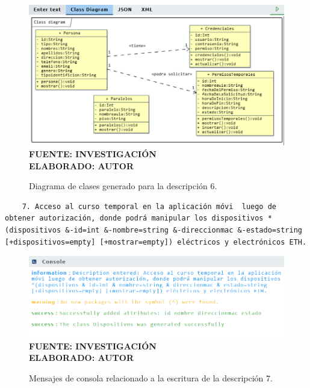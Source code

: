  \begin{figure}[H]
 	\centering
 	\caption{Diagrama de clases generado para la descripción 6.}
 	\includegraphics[width=15cm]{img/dc-eva-006.png}
 	\label{fig:dc_eva_006}
 	\vspace{4mm}
 	{\footnotesize \textbf{\\ FUENTE: INVESTIGACIÓN} \textbf{\\ ELABORADO: AUTOR}}
 \end{figure}
 
  \begin{lstlisting}
 	7. Acceso al curso temporal en la aplicación móvi  luego de obtener autorización, donde podrá manipular los dispositivos *(dispositivos &-id=int &-nombre=string &-direccionmac &-estado=string [+dispositivos=empty] [+mostrar=empty]) eléctricos y electrónicos ETH. \end{lstlisting}
 
     \begin{figure}[h!]
     	\centering
 	\caption{Mensajes de consola relacionado a la escritura de la descripción 7.}
 	\includegraphics[width=14cm]{img/not-eva-007.png}
 	\label{fig:not_eva_007}
 	\vspace{4mm}
 	{\footnotesize \textbf{\\ FUENTE: INVESTIGACIÓN} \textbf{\\ ELABORADO: AUTOR}}
 \end{figure}
 
